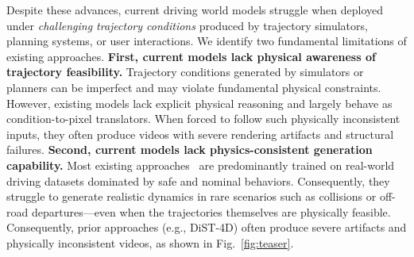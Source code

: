 \documentclass[runningheads]{llncs}
\begin{document}
Despite these advances, current driving world models struggle when deployed under \textit{challenging trajectory conditions} produced by trajectory simulators, planning systems, or user interactions. We identify two fundamental limitations of existing approaches.
\textbf{First, current models lack physical awareness of trajectory feasibility.} Trajectory conditions generated by simulators or planners can be imperfect and may violate fundamental physical constraints. However, existing models lack explicit physical reasoning and largely behave as condition-to-pixel translators. When forced to follow such physically inconsistent inputs, they often produce videos with severe rendering artifacts and structural failures.
\textbf{Second, current models lack physics-consistent generation capability.} Most existing approaches~\cite{gao2025magicdrive,gao2025magicdrive,guo2025genesis,wen2024panacea,chen2025unimlvg} are predominantly trained on real-world driving datasets dominated by safe and nominal behaviors. Consequently, they struggle to generate realistic dynamics in rare scenarios such as collisions or off-road departures—even when the trajectories themselves are physically feasible. 
Consequently, prior approaches (e.g., DiST-4D) often produce severe artifacts and physically inconsistent videos, as shown in Fig.~\ref{fig:teaser}.






\end{document}
